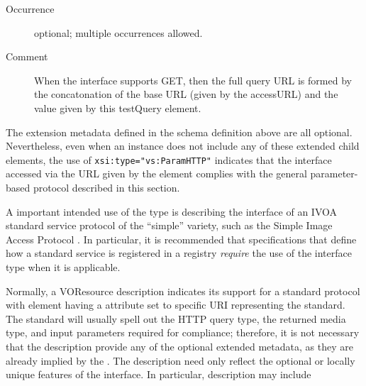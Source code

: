 \documentclass[11pt,a4paper]{ivoa}
\begin{document}
\begin{generated}
\begin{bigdescription}
\begin{description}
\item[Occurrence] optional; multiple occurrences allowed.
\item[Comment] 
                       When the interface supports GET, then the full 
                       query URL is formed by the concatonation of the 
                       base URL (given by the accessURL) and the value 
                       given by this testQuery element.  
                    

\end{description}


\end{bigdescription}\endgroup

\endgroup
\end{generated}


The extension metadata defined in the schema definition above are all
optional.  Nevertheless, even when an 
instance does not include any of these extended child elements, the
use of \verb|xsi:type="vs:ParamHTTP"| indicates that the interface
accessed via the URL given by the 
element complies with the general parameter-based protocol described
in this section.






A important intended use of the  type is
describing the interface of an IVOA standard service protocol 
of the ``simple'' variety, such as the Simple Image Access Protocol
\citep{2015ivoa.spec.1223D}.  In particular, it is recommended that
specifications that define how a standard service is registered in a
registry \emph{require} the use of the 
interface type when it is applicable.



Normally, a VOResource
description indicates its support for a standard protocol with
 element having a
 attribute set to specific URI representing the
standard.  The standard will usually spell out the HTTP query type,
the returned media type, and input parameters required for compliance;
therefore, it is not necessary that the 
description provide any of the optional extended metadata, as they are
already implied by the .  The description need
only reflect the optional or locally unique features of the
interface.  In particular, description may include
\end{document}
